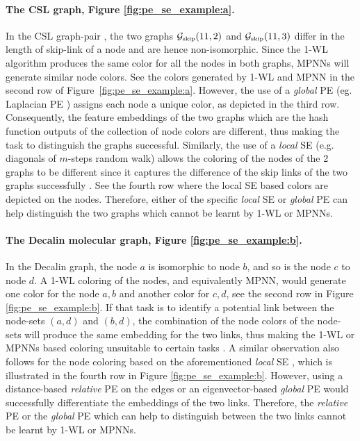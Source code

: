 \documentclass{article}
\begin{document}
\paragraph{The CSL graph, Figure \ref{fig:pe_se_example:a}.}
In the CSL graph-pair \cite{murphy2019relational},
the two graphs $\mathcal{G}_{\textrm{\tiny skip}}(11,2)$ and $\mathcal{G}_{\textrm{\tiny skip}}(11,3)$ differ in the length of skip-link of a node and are hence non-isomorphic. Since the 1-WL algorithm produces the same color for all the nodes in both graphs, MPNNs will generate similar node colors. See the colors generated by 1-WL and MPNN in the second row of Figure~\ref{fig:pe_se_example:a}. 
However, the use of a \textit{global} PE (eg. Laplacian PE \cite{dwivedi2020benchmarking}) assigns each node a unique color, as depicted in the third row. Consequently, the feature embeddings of the two graphs which are the hash function outputs of the collection of node colors are different, thus making the task to distinguish the graphs successful.
Similarly, the use of a \textit{local} SE (e.g. diagonals of $m$-steps random walk) allows the coloring of the nodes of the 2 graphs to be different \cite{dwivedi2022LPE} since it captures the difference of the skip links of the two graphs successfully \cite{loukas2020graph}. See the fourth row where the local SE based colors are depicted on the nodes. Therefore, either of the specific \textit{local} SE or \textit{global} PE can help distinguish the two graphs which cannot be learnt by 1-WL or MPNNs.

\paragraph{The Decalin molecular graph, Figure \ref{fig:pe_se_example:b}.}
In the Decalin graph,
the node $a$ is isomorphic to node $b$, and so is the node $c$ to node $d$. A 1-WL coloring of the nodes, and equivalently MPNN, would generate one color for the node $a,b$ and another color for $c,d$, see the second row in Figure \ref{fig:pe_se_example:b}. If that task is to identify a potential link between the node-sets $(a,d)$ and $(b,d)$, the combination of the node colors of the node-sets will produce the same embedding for the two links, thus making the 1-WL or MPNNs based coloring unsuitable to certain tasks \cite{zhang2021labeling}.
A similar observation also follows for the node coloring based on the aforementioned \textit{local} SE \cite{dwivedi2022LPE}, which is illustrated in the fourth row in Figure \ref{fig:pe_se_example:b}. However, using a distance-based \textit{relative} PE on the edges or an eigenvector-based \textit{global} PE would successfully differentiate the embeddings of the two links.
Therefore, the \textit{relative} PE or the \textit{global} PE which can help to distinguish between the two links cannot be learnt by 1-WL or MPNNs.
\end{document}
